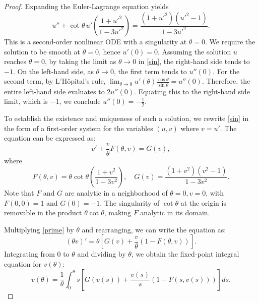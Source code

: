 \documentclass[a4paper,12pt]{amsart}
\theoremstyle{plain}
\theoremstyle{definition}
\begin{document}
\begin{proof}
Expanding the Euler-Lagrange equation yields
\begin{equation} \label{sin}
 u'' + \cot\theta \, u' \left( \frac{1+u'^2}{1-3u'^2} \right) = \frac{(1+u'^2)(u'^2-1)}{1-3u'^2} .
\end{equation}
This is a second-order nonlinear ODE with a singularity at $\theta = 0$. We require the solution to be smooth at $\theta=0$, hence $u'(0) = 0$. Assuming the solution $u$ reaches $\theta=0$, by taking the limit as $\theta \to 0$ in \eqref{sin}, the right-hand side tends to $-1$. On the left-hand side, as $\theta \to 0$, the first term tends to $u''(0)$. 
For the second term, by L'H\^{o}pital's rule, $\lim_{\theta \to 0} u'(\theta)\frac{\cos\theta}{\sin\theta} = u''(0)$. Therefore, 
the entire left-hand side evaluates to $2u''(0)$. Equating this to 
the right-hand side limit, which is $-1$, we conclude $u''(0) =- \frac12$.
 
 To establish the existence and uniqueness of such a solution, we rewrite \eqref{sin} in the form of a first-order system for the variables $(u, v)$ where $v = u'$. The equation can be expressed as:
\begin{equation} \label{prime}
 v' + \frac{v}{\theta} F(\theta, v) = G(v),
\end{equation}
where 
$$F(\theta, v) = \theta \cot \theta \left( \frac{1+v^2}{1-3v^2} \right),\quad G(v) = \frac{(1+v^2)(v^2-1)}{1-3v^2}.$$
 Note that $F$ and $G$ are analytic in a neighborhood of $\theta = 0, v = 0$, with $F(0, 0) = 1$ and $G(0) = -1$. The singularity of $\cot \theta$ at the origin is removable in the product $\theta \cot \theta$, making $F$ analytic in its domain.


Multiplying \eqref{prime} by $\theta$ and rearranging, we can write the equation as:
\begin{equation*}
 (\theta v)' = \theta \left[ G(v) + \frac{v}{\theta} (1 - F(\theta, v)) \right].
\end{equation*}
Integrating from $0$ to $\theta$ and dividing by $\theta$, we obtain the fixed-point integral equation for $v(\theta)$:
\begin{equation} \label{ope}
 v(\theta) = \frac{1}{\theta} \int_0^\theta s \left[ G(v(s)) + \frac{v(s)}{s} (1 - F(s, v(s))) \right] ds.
\end{equation}
 

\end{proof}
\end{document}
